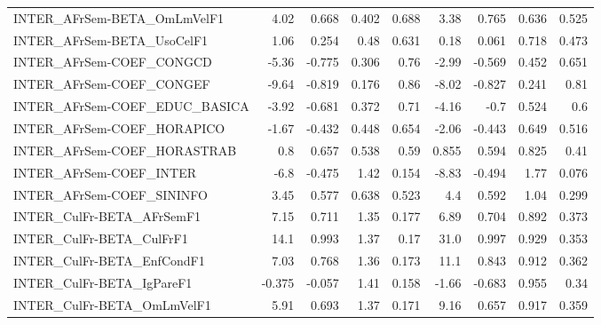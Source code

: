 \begin{tabular}{lrrrrrrrr}
INTER\_AFrSem-BETA\_OmLmVelF1           &        4.02 &        0.668 &    0.402 &    0.688 &       3.38 &       0.765 &        0.636 &         0.525 \\
INTER\_AFrSem-BETA\_UsoCelF1            &        1.06 &        0.254 &     0.48 &    0.631 &       0.18 &       0.061 &        0.718 &         0.473 \\
INTER\_AFrSem-COEF\_CONGCD              &       -5.36 &       -0.775 &    0.306 &     0.76 &      -2.99 &      -0.569 &        0.452 &         0.651 \\
INTER\_AFrSem-COEF\_CONGEF              &       -9.64 &       -0.819 &    0.176 &     0.86 &      -8.02 &      -0.827 &        0.241 &          0.81 \\
INTER\_AFrSem-COEF\_EDUC\_BASICA         &       -3.92 &       -0.681 &    0.372 &     0.71 &      -4.16 &        -0.7 &        0.524 &           0.6 \\
INTER\_AFrSem-COEF\_HORAPICO            &       -1.67 &       -0.432 &    0.448 &    0.654 &      -2.06 &      -0.443 &        0.649 &         0.516 \\
INTER\_AFrSem-COEF\_HORASTRAB           &         0.8 &        0.657 &    0.538 &     0.59 &      0.855 &       0.594 &        0.825 &          0.41 \\
INTER\_AFrSem-COEF\_INTER               &        -6.8 &       -0.475 &     1.42 &    0.154 &      -8.83 &      -0.494 &         1.77 &         0.076 \\
INTER\_AFrSem-COEF\_SININFO             &        3.45 &        0.577 &    0.638 &    0.523 &        4.4 &       0.592 &         1.04 &         0.299 \\
INTER\_CulFr-BETA\_AFrSemF1             &        7.15 &        0.711 &     1.35 &    0.177 &       6.89 &       0.704 &        0.892 &         0.373 \\
INTER\_CulFr-BETA\_CulFrF1              &        14.1 &        0.993 &     1.37 &     0.17 &       31.0 &       0.997 &        0.929 &         0.353 \\
INTER\_CulFr-BETA\_EnfCondF1            &        7.03 &        0.768 &     1.36 &    0.173 &       11.1 &       0.843 &        0.912 &         0.362 \\
INTER\_CulFr-BETA\_IgPareF1             &      -0.375 &       -0.057 &     1.41 &    0.158 &      -1.66 &      -0.683 &        0.955 &          0.34 \\
INTER\_CulFr-BETA\_OmLmVelF1            &        5.91 &        0.693 &     1.37 &    0.171 &       9.16 &       0.657 &        0.917 &         0.359 \\

\end{tabular}
